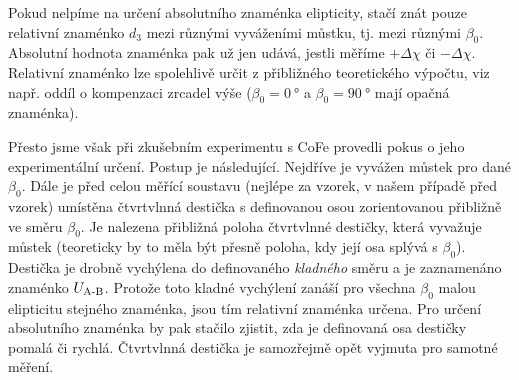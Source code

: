 Pokud nelpíme na určení absolutního znaménka elipticity, stačí znát pou\-ze relativní znaménko $d_3$ mezi různými vyváženími můstku, tj. mezi různými $\beta_0$.
Absolutní hodnota znaménka pak už jen udává, jestli měříme $+\Delta\chi$ či $-\Delta\chi$.
Relativní znaménko lze spolehlivě určit z přibližného teoretického výpočtu, viz např. oddíl o kompenzaci zrcadel výše ($\beta_0=\SI{0}{\degree}$ a $\beta_0=\SI{90}{\degree}$ mají opačná znaménka).

Přesto jsme však při zkušebním experimentu s CoFe provedli pokus o jeho experimentální určení.
Postup je následující.
Nejdříve je vyvážen můstek pro dané $\beta_0$.
Dále je před celou měřící soustavu (nejlépe za vzorek, v našem případě před vzorek) umístěna čtvrtvlnná destička s definovanou osou zorientovanou přibližně ve směru $\beta_0$.
Je nalezena přibližná poloha čtvrtvlnné destičky, která vyvažuje můstek (teoreticky by to měla být přesně poloha, kdy její osa splývá s $\beta_0$).
Destička je drobně vychýlena do definovaného \emph{kladného} směru a je zaznamenáno znaménko $U_\textrm{A-B}$.
Protože toto kladné vychýlení zanáší pro všechna $\beta_0$ malou elipticitu stejného znaménka, jsou tím relativní znaménka určena.
Pro určení absolutního znaménka by pak stačilo zjistit, zda je definovaná osa destičky pomalá či rychlá.
Čtvrtvlnná destička je samozřejmě opět vyjmuta pro samotné měření.

